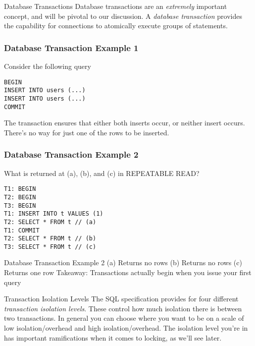 \documentclass[14pt]{beamer}
\begin{document}
\begin{frame}{Database Transactions}
  Database transactions are an \emph{extremely} important concept, and will be
  pivotal to our discussion.
  \pause
  \newline
  \newline
  A \emph{database transaction} provides the capability for connections to atomically execute groups of statements.
\end{frame}

\begin{frame}[fragile]
  \frametitle{Database Transaction Example 1}
  Consider the following query
  \begin{verbatim}
BEGIN
INSERT INTO users (...)
INSERT INTO users (...)
COMMIT
  \end{verbatim}

  The transaction ensures that either both inserts occur, or neither insert
  occurs. There's no way for just one of the rows to be inserted.
\end{frame}

\begin{frame}[fragile]
  \frametitle{Database Transaction Example 2}
  What is returned at (a), (b), and (c) in REPEATABLE READ?
  \begin{verbatim}
T1: BEGIN
T2: BEGIN
T3: BEGIN
T1: INSERT INTO t VALUES (1)
T2: SELECT * FROM t // (a)
T1: COMMIT
T2: SELECT * FROM t // (b)
T3: SELECT * FROM t // (c)
  \end{verbatim}
\end{frame}

\begin{frame}{Database Transaction Example 2}
(a) Returns no rows
\newline
(b) Returns no rows
\newline
(c) Returns one row
\newline
Takeaway: Transactions actually begin when you issue your first query
\end{frame}

\begin{frame}{Transaction Isolation Levels}
  The SQL specification provides for four different \emph{transaction isolation
    levels}. These control how much isolation there is between two transactions.
  \newline
  \newline
  In general you can choose where you want to be on a scale of low
  isolation/overhead and high isolation/overhead. The isolation level you're in
  has important ramifications when it comes to locking, as we'll see later.
\end{frame}
\end{document}
